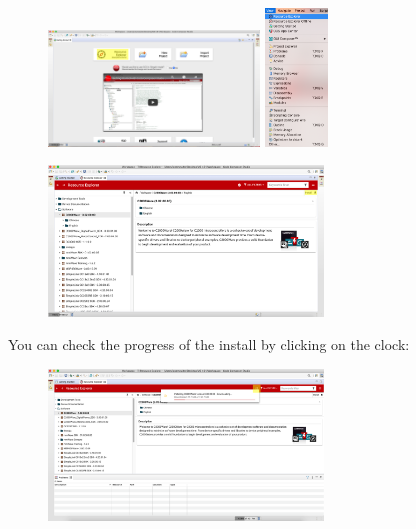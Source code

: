 \documentclass{article}
\begin{document}
\begin{figure}[H]
    \centering
    {{\includegraphics[width=0.5\textwidth]{ccs_configure_1.png} }}
    \qquad
    {{\includegraphics[width=0.15\textwidth]{ccs_configure_2.png} }}
\end{figure}

\begin{figure}[H]
    \centering
  \includegraphics[width = 0.65\textwidth]{ccs_configure_3.png} 
\end{figure}

You can check the progress of the install by clicking on the clock:

\begin{figure}[H]
    \centering
  \includegraphics[width = 0.65\textwidth]{ccs_configure_4} 
\end{figure}
\end{document}
